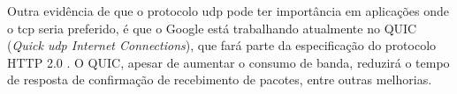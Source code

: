 Outra evidência de que o protocolo \gls*{udp} pode ter importância em aplicações onde o
\gls*{tcp} seria preferido, é que o Google está trabalhando atualmente no QUIC
(\emph{Quick \gls*{udp} Internet Connections}), que fará parte da especificação do
protocolo HTTP 2.0 \cite{site:chromium-quic}. O QUIC, apesar de aumentar o consumo de
banda, reduzirá o tempo de resposta de confirmação de recebimento de pacotes, entre
outras melhorias.